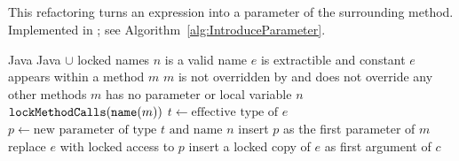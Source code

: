 \subsection{}
This refactoring turns an expression into a parameter of the surrounding method. Implemented in ; see Algorithm~\ref{alg:IntroduceParameter}.

\begin{algorithm}
\caption{$\refactoring{Introduce Parameter}(e : \type{Expr}, n : \type{Name})$}
\label{alg:IntroduceParameter}
\begin{algorithmic}[1]
\REQUIRE Java
\ENSURE Java $\cup$ locked names
\medskip
\STATE \assert $n$ is a valid name
\STATE \assert $e$ is extractible and constant
\STATE \assert $e$ appears within a method $m$
\STATE \assert $m$ is not overridden by and does not override any other methods
\STATE \assert $m$ has no parameter or local variable $n$
\STATE $\text{\texttt{lockMethodCalls}}(\text{\texttt{name}}(m))$
\STATE $t \leftarrow \text{effective type of $e$}$
\STATE $p \leftarrow \text{new parameter of type $t$ and name $n$}$
\STATE insert $p$ as the first parameter of $m$
\STATE replace $e$ with locked access to $p$
  \STATE insert a locked copy of $e$ as first argument of $c$
\ENDFOR
\end{algorithmic}
\end{algorithm}
